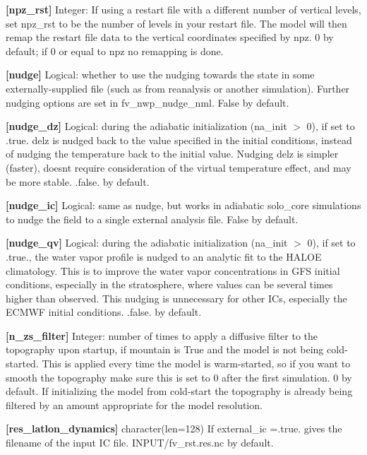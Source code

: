 {\bfseries \mbox{[}npz\+\_\+rst\mbox{]}} Integer\+: If using a restart file with a different number of vertical levels, set npz\+\_\+rst to be the number of levels in your restart file. The model will then remap the restart file data to the vertical coordinates specified by npz. 0 by default; if 0 or equal to npz no remapping is done.

{\bfseries \mbox{[}nudge\mbox{]}} Logical\+: whether to use the nudging towards the state in some externally-\/supplied file (such as from reanalysis or another simulation). Further nudging options are set in fv\+\_\+nwp\+\_\+nudge\+\_\+nml. False by default.

{\bfseries \mbox{[}nudge\+\_\+dz\mbox{]}} Logical\+: during the adiabatic initialization (na\+\_\+init $>$ 0), if set to .true. delz is nudged back to the value specified in the initial conditions, instead of nudging the temperature back to the initial value. Nudging delz is simpler (faster), doesn\textquotesingle{}t require consideration of the virtual temperature effect, and may be more stable. .false. by default.

{\bfseries \mbox{[}nudge\+\_\+ic\mbox{]}} Logical\+: same as nudge, but works in adiabatic solo\+\_\+core simulations to nudge the field to a single external analysis file. False by default.

{\bfseries \mbox{[}nudge\+\_\+qv\mbox{]}} Logical\+: during the adiabatic initialization (na\+\_\+init $>$ 0), if set to .true., the water vapor profile is nudged to an analytic fit to the H\+A\+L\+OE climatology. This is to improve the water vapor concentrations in G\+FS initial conditions, especially in the stratosphere, where values can be several times higher than observed. This nudging is unnecessary for other I\+Cs, especially the E\+C\+M\+WF initial conditions. .false. by default.

{\bfseries \mbox{[}n\+\_\+zs\+\_\+filter\mbox{]}} Integer\+: number of times to apply a diffusive filter to the topography upon startup, if mountain is True and the model is not being cold-\/started. This is applied every time the model is warm-\/started, so if you want to smooth the topography make sure this is set to 0 after the first simulation. 0 by default. If initializing the model from cold-\/start the topography is already being filtered by an amount appropriate for the model resolution.

{\bfseries \mbox{[}res\+\_\+latlon\+\_\+dynamics\mbox{]}} character(len=128) If external\+\_\+ic =.true. gives the filename of the input IC file. I\+N\+P\+U\+T/fv\+\_\+rst.\+res.\+nc by default.

